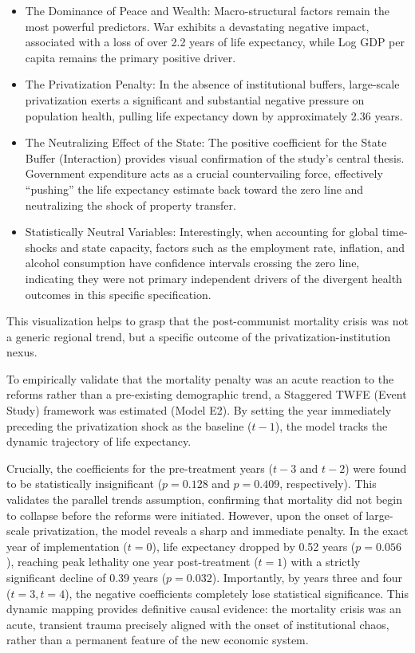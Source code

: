 \documentclass[12pt]{article}
\begin{document}
\begin{itemize}
    \item The Dominance of Peace and Wealth: Macro-structural factors remain the most powerful predictors. War exhibits a devastating negative impact, associated with a loss 
    of over 2.2 years of life expectancy, while Log GDP per capita remains the primary positive driver.
    \item The Privatization Penalty: In the absence of institutional buffers, large-scale privatization exerts a significant and substantial negative pressure on population 
    health, pulling life expectancy down by approximately 2.36 years.
    \item The Neutralizing Effect of the State: The positive coefficient for the State Buffer (Interaction) provides visual confirmation of the study's central thesis. 
    Government expenditure acts as a crucial countervailing force, effectively ``pushing'' the life expectancy estimate back toward the zero line and neutralizing the shock of 
    property transfer.
    \item Statistically Neutral Variables: Interestingly, when accounting for global time-shocks and state capacity, factors such as the employment rate, inflation, and 
    alcohol consumption have confidence intervals crossing the zero line, indicating they were not primary independent drivers of the divergent health outcomes in this specific 
    specification.
\end{itemize}

This visualization helps to grasp that the post-communist mortality crisis was not a generic regional trend, but a specific outcome of the privatization-institution nexus.


To empirically validate that the mortality penalty was an acute reaction to the reforms rather than a pre-existing demographic trend, a Staggered TWFE (Event Study) framework was 
estimated (Model E2). By setting the year immediately preceding the privatization shock as the baseline ($t-1$), the model tracks the dynamic trajectory of life expectancy.

Crucially, the coefficients for the pre-treatment years ($t-3$ and $t-2$) were found to be statistically insignificant ($p = 0.128$ and $p = 0.409$, respectively). This validates 
the parallel trends assumption, confirming that mortality did not begin to collapse before the reforms were initiated. However, upon the onset of large-scale privatization, the model 
reveals a sharp and immediate penalty. In the exact year of implementation ($t=0$), life expectancy dropped by 0.52 years ($p = 0.056$), reaching peak lethality one year post-treatment 
($t=1$) with a strictly significant decline of 0.39 years ($p = 0.032$). Importantly, by years three and four ($t=3, t=4$), the negative coefficients completely lose statistical 
significance. This dynamic mapping provides definitive causal evidence: the mortality crisis was an acute, transient trauma precisely aligned with the onset of institutional chaos, 
rather than a permanent feature of the new economic system.
\end{document}
